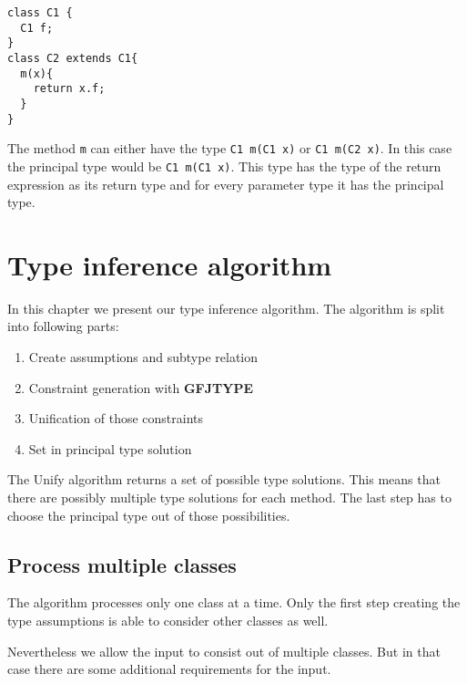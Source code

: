 \documentclass[acmsmall,screen,review]{acmart}
\begin{document}
\begin{lstlisting}
class C1 {
  C1 f;
}
class C2 extends C1{
  m(x){
    return x.f;
  }
}
\end{lstlisting}
The method \texttt{m} can either have the type \texttt{C1 m(C1 x)}
or \texttt{C1 m(C2 x)}.
In this case the principal type would be \texttt{C1 m(C1 x)}.
This type has the type of the return expression as its return type
and for every parameter type it has the principal type.

\section{Type inference algorithm}
In this chapter we present our type inference algorithm.
The algorithm is split into following parts:

\begin{enumerate}
\item Create assumptions and subtype relation
\item Constraint generation with \textbf{GFJTYPE}
\item Unification of those constraints
\item Set in principal type solution
\end{enumerate}

The Unify algorithm returns a set of possible type solutions.
This means that there are possibly multiple type solutions for each method.
The last step has to choose the principal type out of those possibilities.

\subsection{Process multiple classes}
The algorithm processes only one class at a time.
Only the first step creating the type assumptions is able to consider other classes as well.

Nevertheless we allow the input to consist out of multiple classes.
But in that case there are some additional requirements for the input.
\end{document}
